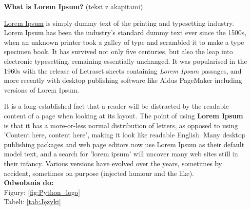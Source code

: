 \begin{flushleft}
\vspace{0.5cm}

\textbf{What is Lorem Ipsum?} (tekst z akapitami)\\

\setlength{\parindent}{10ex}
    \par{\underline{Lorem Ipsum} is simply dummy text of the printing and typesetting industry. Lorem Ipsum has been the industry's standard dummy text ever since the 1500s, when an unknown printer took a galley of type and scrambled it to make a type specimen book. It has survived not only five centuries, but also the leap into electronic typesetting, remaining essentially unchanged. It was popularised in the 1960s with the release of Letraset sheets containing \textit{Lorem Ipsum} passages, and more recently with desktop publishing software like Aldus PageMaker including versions of Lorem Ipsum.}\\
\setlength{\parindent}{10ex}
    \par{It is a long established fact that a reader will be distracted by the readable content of a page when looking at its layout. The point of using \textbf{Lorem Ipsum} is that it has a more-or-less normal distribution of letters, as opposed to using 'Content here, content here', making it look like readable English. Many desktop publishing packages and web page editors now use Lorem Ipsum as their default model text, and a search for 'lorem ipsum' will uncover many web sites still in their infancy. Various versions have evolved over the years, sometimes by accident, sometimes on purpose (injected humour and the like).}\vspace{0.5cm}\\
\textbf{Odwołania do:}\\
Figury: \ref{fig:Python_logo}\\
Tabeli: \ref{tab:Języki}
\end{flushleft}